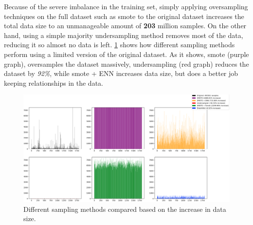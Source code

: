 Because of the severe imbalance in the training set, simply applying oversampling techniques on the full dataset such as \acrshort{smote} to the original dataset increases the total data size to an unmanageable amount of \textbf{203} million samples. On the other hand, using a simple majority undersampling method removes most of the data, reducing it so almost no data is left. \cref{fig:all_samplers} shows how different sampling methods perform using a limited version of the original dataset. As it shows, \acrshort{smote} (purple graph), oversamples the dataset massively, undersampling (red graph) reduces the dataset by \textit{92\%}, while \acrshort{smote} + ENN increases data size, but does a better job keeping relationships in the data.

\begin{figure}[htbp]
    \centering
    \includegraphics[width=1.0\textwidth]{figures/imbalance/all_samplers}
    \caption{Different sampling methods compared based on the increase in data size.}
    \label{fig:all_samplers}
\end{figure}

